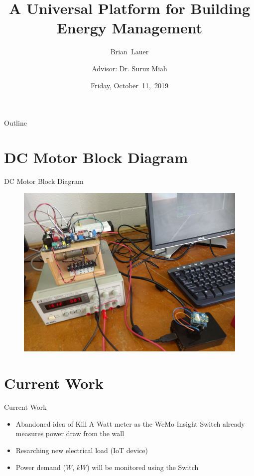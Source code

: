 \documentclass{beamer}
\title[Progress]{A Universal Platform for Building Energy Management}
\author[B.~Lauer]{Brian~Lauer\\\and
Advisor: Dr. Suruz Miah}
\institute[Bradley University] %
{
  Department of Electrical and Computer Engineering\\
  Bradley University\\
  1501 W. Bradley Avenue\\
  Peoria, IL, 61625, USA
}
\date[October~11,~2019]{Friday, October~11,~2019}
\begin{document}
\begin{frame}
  \titlepage
\end{frame}

\begin{frame}{Outline}
  \tableofcontents
\end{frame}
%
\section{DC Motor Block Diagram}
\begin{frame}{DC Motor Block Diagram}
\begin{figure}
\centering
\includegraphics[scale=0.05]{../figs/motorSetup}
\end{figure}
\end{frame}
%
\section{Current Work}
\begin{frame}{Current Work}
\begin{itemize}
\item Abandoned idea of Kill A Watt meter as the WeMo Insight Switch already measures power draw from the wall
\item Resarching new electrical load (IoT device)
\item Power demand ($W$, $kW$) will be monitored using the Switch
\end{itemize}
\end{frame}
%
\end{document}
